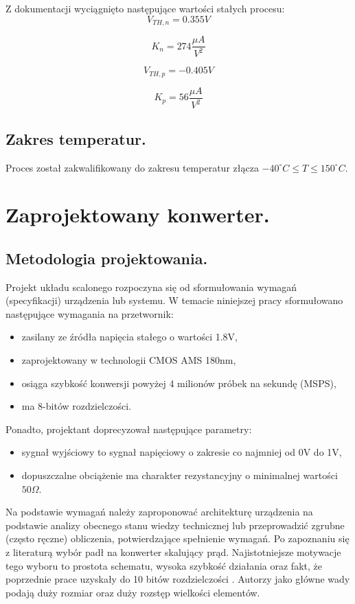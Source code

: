 \documentclass[10pt,a4paper]{report}
\begin{document}
	{	Z dokumentacji wyciągnięto następujące wartości stałych procesu:
		$$
			V_{TH,n} = 0.355V
		$$
		
		$$
			K_n = 274 \frac{\mu A}{V^2}
		$$

		$$
			V_{TH,p} = -0.405V
		$$
	
		$$
			K_p = 56 \frac{\mu A}{V^2}
		$$	
	}
	\section{Zakres temperatur.}
	{	Proces został zakwalifikowany do zakresu temperatur złącza $-40^\circ C \leq T \leq 150^\circ C$. }


	
	\chapter{Zaprojektowany konwerter.}
	\section{Metodologia projektowania.}
	{	Projekt układu scalonego rozpoczyna się od sformułowania wymagań (specyfikacji) urządzenia lub systemu. W temacie niniejszej pracy 	sformułowano następujące wymagania na przetwornik:
		\begin{itemize}
			\item zasilany ze źródła napięcia stałego o wartości 1.8V,
			\item zaprojektowany w technologii CMOS AMS 180nm,
			\item osiąga szybkość konwersji powyżej 4 milionów próbek na sekundę (MSPS),
			\item ma 8-bitów rozdzielczości.
		\end{itemize} 
	Ponadto, projektant doprecyzował następujące parametry:
		\begin{itemize}
			\item sygnał wyjściowy to sygnał napięciowy o zakresie co najmniej od 0V do 1V,
			\item dopuszczalne obciążenie ma charakter rezystancyjny o minimalnej wartości $50\Omega$.
		\end{itemize} }
	
	{	Na podstawie wymagań należy zaproponować architekturę urządzenia na podstawie analizy obecnego stanu wiedzy technicznej lub przeprowadzić zgrubne (często ręczne) obliczenia, potwierdzające spełnienie wymagań. Po zapoznaniu się z literaturą wybór padł na konwerter skalujący prąd. Najistotniejsze motywacje tego wyboru to prostota schematu, wysoka szybkość działania \cite{cmosanal} oraz fakt, że poprzednie prace uzyskały do 10 bitów rozdzielczości \cite{plassche}.	Autorzy \cite{cmosanal} jako główne wady podają duży rozmiar oraz duży rozstęp wielkości elementów.}
	
\end{document}
